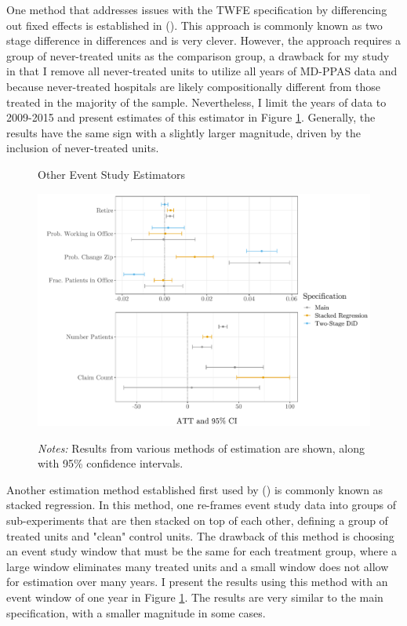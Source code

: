 \documentclass[11pt]{article}
\begin{document}
One method that addresses issues with the TWFE specification by differencing out fixed effects is established in \citeauthor{gardner2021two} (\citeyear{gardner2021two}). This approach is commonly known as two stage difference in differences and is very clever. However, the approach requires a group of never-treated units as the comparison group, a drawback for my study in that I remove all never-treated units to utilize all years of MD-PPAS data and because never-treated hospitals are likely compositionally different from those treated in the majority of the sample. Nevertheless, I limit the years of data to 2009-2015 and present estimates of this estimator in Figure \ref{fig:esimators}. Generally, the results have the same sign with a slightly larger magnitude, driven by the inclusion of never-treated units. 

\begin{figure}[ht]
    \centering
    \captionsetup{width=.57\linewidth}
    \caption{Other Event Study Estimators}
    \includegraphics[scale=.57]{Objects/estimators_graph.pdf}
    \label{fig:esimators}
    \vspace{2mm}
    \caption*{\footnotesize{\textit{Notes:} Results from various methods of estimation are shown, along with 95\% confidence intervals.}}
\end{figure}

Another estimation method established first used by \citeauthor{cengiz2019effect} (\citeyear{cengiz2019effect}) is commonly known as stacked regression. In this method, one re-frames event study data into groups of sub-experiments that are then stacked on top of each other, defining a group of treated units and "clean" control units. The drawback of this method is choosing an event study window that must be the same for each treatment group, where a large window eliminates many treated units and a small window does not allow for estimation over many years. I present the results using this method with an event window of one year in Figure \ref{fig:esimators}. The results are very similar to the main specification, with a smaller magnitude in some cases. 
\end{document}
